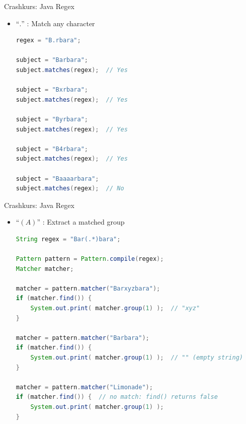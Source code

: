 \documentclass[18pt]{beamer}
\newcommand{\quotes}[1]{``#1''}
\begin{document}
\begin{frame}[fragile]{Crashkurs: Java Regex}
    \begin{itemize}
        \item \Large{\quotes{\alert{\texttt{$.$}}}} : Match any character

        \vspace{.2in}

        \begin{lstlisting}[language=Java,basicstyle=\scriptsize]
regex = "B.rbara";

subject = "Barbara";
subject.matches(regex);  // Yes

subject = "Bxrbara";
subject.matches(regex);  // Yes

subject = "Byrbara";
subject.matches(regex);  // Yes

subject = "B4rbara";
subject.matches(regex);  // Yes

subject = "Baaaarbara";
subject.matches(regex);  // No
        \end{lstlisting}

    \end{itemize}
\end{frame}

\begin{frame}[fragile]{Crashkurs: Java Regex}
    \begin{itemize}
        \item \Large{\quotes{\alert{\texttt{$(A)$}}}} : Extract a matched group

        \vspace{.2in}

        \begin{lstlisting}[language=Java,basicstyle=\scriptsize]
String regex = "Bar(.*)bara";

Pattern pattern = Pattern.compile(regex);
Matcher matcher;

matcher = pattern.matcher("Barxyzbara");
if (matcher.find()) {
    System.out.print( matcher.group(1) );  // "xyz"
}

matcher = pattern.matcher("Barbara");
if (matcher.find()) {
    System.out.print( matcher.group(1) );  // "" (empty string)
}

matcher = pattern.matcher("Limonade");
if (matcher.find()) {  // no match: find() returns false
    System.out.print( matcher.group(1) );
}
        \end{lstlisting}

    \end{itemize}
\end{frame}
\end{document}
